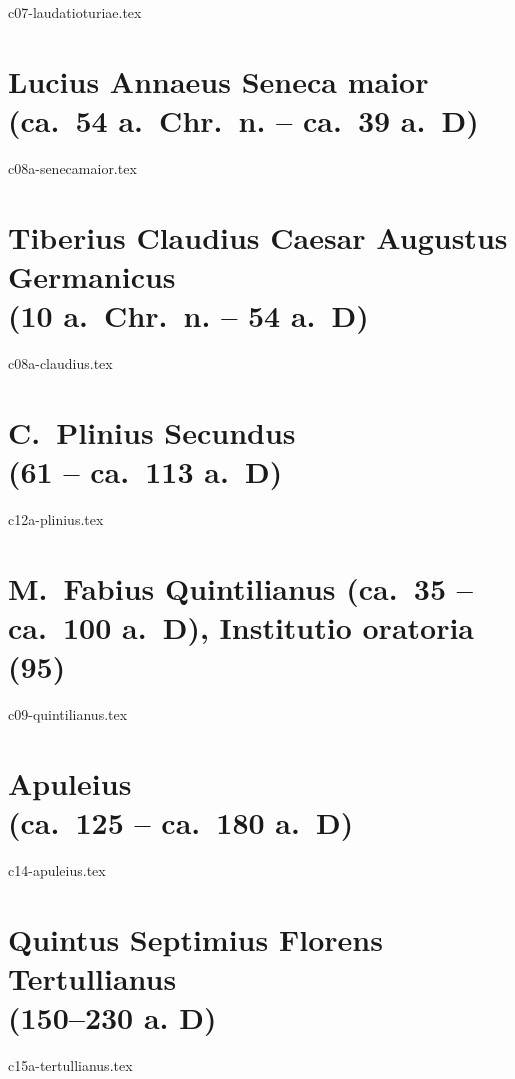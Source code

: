 \documentclass[a4paper,12pt,twoside]{report}
\begin{document}
{c07-laudatioturiae.tex}

\chapter[Seneca maior]{Lucius Annaeus Seneca maior \\(ca.\ 54 a.~Chr.\ n. – ca.\ 39 a.~D)}

{c08a-senecamaior.tex}

\chapter[Claudius]{Tiberius Claudius Caesar Augustus Germanicus \\(10 a.~Chr.~n. – 54 a.~D)}

{c08a-claudius.tex}


\chapter[Plinius minor]{C.\ Plinius Secundus \\(61 – ca.\ 113 a.~D)}

{c12a-plinius.tex}

\chapter[Quintilianus]{M.\ Fabius Quintilianus (ca.\ 35 – ca.\ 100 a.~D), Institutio oratoria (95)}

{c09-quintilianus.tex}

\chapter[Apuleius]{Apuleius \\(ca.\ 125 – ca.\ 180 a.~D)}

{c14-apuleius.tex}

\chapter[Tertullianus]{Quintus Septimius Florens Tertullianus \\(150–230 a. D)}

{c15a-tertullianus.tex}




\end{document}
